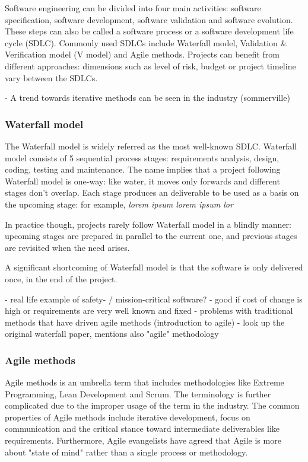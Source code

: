 Software engineering can be divided into four main activities: software specification, software development, software validation and software evolution. \cite{sommerville_software_2016} These steps can also be called a software process or a software development life cycle (SDLC). Commonly used SDLCs include Waterfall model, Validation \& Verification model (V model) and Agile methods. \cite{balaji_waterfall_2012} Projects can benefit from different approaches: dimensions such as level of risk, budget or project timeline vary between the SDLCs. \cite{alshamrani_comparison_2015, cohen_introduction_2004} 

- A trend towards iterative methods can be seen in the industry (sommerville) 

\subsubsection{Waterfall model}

The Waterfall model is widely referred as the most well-known SDLC. Waterfall model consists of 5 sequential process stages: requirements analysis, design, coding, testing and maintenance. \cite{alshamrani_comparison_2015} The name implies that a project following Waterfall model is one-way: like water, it moves only forwards and different stages don't overlap. Each stage produces an deliverable to be used as a basis on the upcoming stage: for example, \textit{lorem ipsum lorem ipsum lor}~\cite{balaji_waterfall_2012}

In practice though, projects rarely follow Waterfall model in a blindly manner: upcoming stages are prepared in parallel to the current one, and previous stages are revisited when the need arises. \cite{sommerville_software_2016}

A significant shortcoming of Waterfall model is that the software is only delivered once, in the end of the project. 

- real life example of safety- / mission-critical software?
- good if cost of change is high or requirements are very well known and fixed
- problems with traditional methods that have driven agile methods (introduction to agile) 
- look up the original waterfall paper, mentions also "agile" methodology

\subsubsection{Agile methods}

Agile methods is an umbrella term that includes methodologies like Extreme Programming, Lean Development and Scrum. The terminology is further complicated due to the improper usage of the term in the industry. The common properties of Agile methods include iterative development, focus on communication and the critical stance toward intermediate deliverables like requirements. Furthermore, Agile evangelists have agreed that Agile is more about "state of mind" rather than a single process or methodology. \cite{cohen_introduction_2004}

